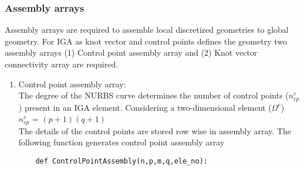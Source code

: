 \documentclass[11pt]{article}
\begin{document}
 

\subsubsection{Assembly arrays}
Assembly arrays are required to assemble local discretized geometries to global
geometry. For IGA as knot vector and control points defines the geometry two
assembly arrays (1) Control point assembly array and (2) Knot vector
connectivity array are required.
\begin{enumerate}[leftmargin=*]
	\item Control point assembly array: \\
	The degree of the NURBS curve determines the number of control points
	($n^e_{cp}$) present in an IGA element.
	Considering a two-dimensional element ($\Omega^e$)\\
	$n^e_{cp}$ = $(p+1)(q+1)$ \\
	The details of the control points are stored row wise in assembly array.
	The following function generates control point assembly array
	\begin{verbatim}
	def ControlPointAssembly(n,p,m,q,ele_no):
	

\end{verbatim}
\end{enumerate}
\end{document}
